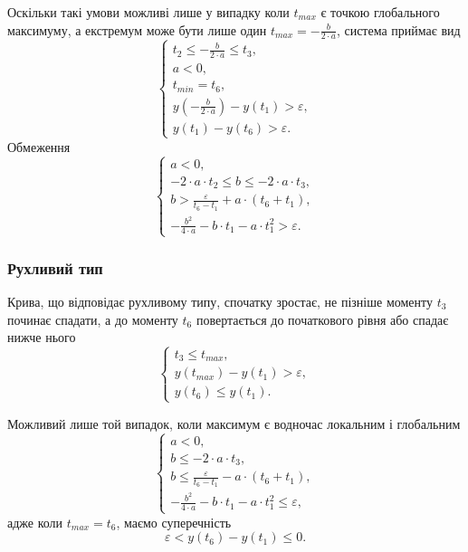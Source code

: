 Оскільки такі умови можливі лише у випадку коли $t_{max}$ є точкою глобального
максимуму, а екстремум може бути лише один $t_{max} = - \frac{b}{2 \cdot a}$,
система приймає вид
\begin{equation*}
  \begin{cases}
    t_2 \le - \frac{b}{2 \cdot a} \le t_3, \\
    a < 0, \\
    t_{min} = t_6, \\
    y\left( - \frac{b}{2 \cdot a} \right) - y\left( t_1\right) > \varepsilon, \\
    y\left( t_1 \right) - y\left( t_6 \right) > \varepsilon.
  \end{cases}
\end{equation*}
Обмеження
\begin{equation*}
  \begin{cases}
    a < 0, \\
    - 2 \cdot a \cdot t_2 \le b \le - 2 \cdot a \cdot t_3, \\
    b > \frac{\varepsilon}{t_6 - t_1} + a \cdot \left( t_6 + t_1 \right), \\
    - \frac{b^2}{4 \cdot a} - b \cdot t_1 - a \cdot t_1^2 > \varepsilon.
  \end{cases}
\end{equation*}

\subsubsection{Рухливий тип}
Крива, що відповідає рухливому типу, спочатку зростає,
не пізніше моменту $t_3$ починає спадати,
а до моменту $t_6$ повертається до початкового рівня або спадає нижче нього
\begin{equation*}
  \begin{cases}
    t_3 \le t_{max}, \\
    y\left( t_{max} \right) - y\left( t_1\right) > \varepsilon, \\
    y\left( t_6 \right) \le y\left( t_1 \right).
  \end{cases}
\end{equation*}

Можливий лише той випадок, коли максимум є водночас локальним і глобальним
\begin{equation*}
  \begin{cases}
    a < 0, \\
    b \le - 2 \cdot a \cdot t_3, \\
    b
    \le \frac{\varepsilon}{t_6 - t_1} - a \cdot \left( t_6 + t_1 \right), \\
    - \frac{b^2}{4 \cdot a} - b \cdot t_1 - a \cdot t_1^2 \le \varepsilon,
  \end{cases}
\end{equation*}
адже коли $t_{max} = t_6$, маємо суперечність
\begin{equation*}
  \varepsilon < y\left( t_6 \right) - y\left( t_1\right) \le 0.
\end{equation*}

